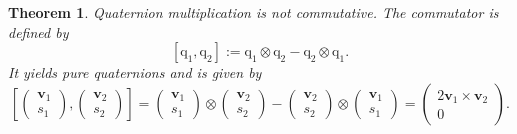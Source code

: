 \documentclass{amsart}
\newtheorem{theorem}{Theorem}[section]
\theoremstyle{definition}
\theoremstyle{remark}
\numberwithin{equation}{section}
\begin{document}
\begin{theorem}
  Quaternion multiplication is not commutative.
  The commutator is defined by
  \begin{equation}
    \left[\mathrm{q}_1, \mathrm{q}_2\right] := \mathrm{q}_1 \otimes \mathrm{q}_2 - \mathrm{q}_2 \otimes \mathrm{q}_1.
  \end{equation}
  It yields pure quaternions and is given by
  \begin{equation}
    \left[
    \begin{pmatrix}
      \mathbf{v}_1 \\
      s_1
    \end{pmatrix} ,
    \begin{pmatrix}
      \mathbf{v}_2 \\
      s_2
    \end{pmatrix}
    \right] =
    \begin{pmatrix}
      \mathbf{v}_1 \\
      s_1
    \end{pmatrix} \otimes
    \begin{pmatrix}
      \mathbf{v}_2 \\
      s_2
    \end{pmatrix} -
    \begin{pmatrix}
      \mathbf{v}_2 \\
      s_2
    \end{pmatrix} \otimes
    \begin{pmatrix}
      \mathbf{v}_1 \\
      s_1
    \end{pmatrix} =
    \begin{pmatrix}
      2\mathbf{v}_1 \times \mathbf{v}_2 \\
      0
    \end{pmatrix}. \label{eqn:commutator}
  \end{equation}
\end{theorem}
\end{document}
